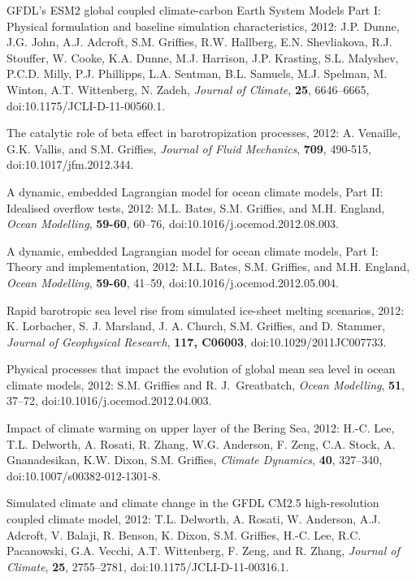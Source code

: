 \begin{etaremune}
\item GFDL’s ESM2 global coupled climate-carbon Earth System Models Part I: Physical formulation and baseline simulation  characteristics, 2012: J.P. Dunne, J.G. John, A.J. Adcroft, S.M. Grif\/f\/ies, R.W. Hallberg, E.N. Shevliakova, R.J. Stouffer,
  W. Cooke, K.A. Dunne, M.J. Harrison, J.P. Krasting, S.L. Malyshev, P.C.D. Milly, P.J. Phillipps, L.A. Sentman, B.L. Samuels,  M.J. Spelman, M. Winton, A.T. Wittenberg, N. Zadeh, {\it Journal of Climate}, {\bf 25}, 6646--6665, doi:10.1175/JCLI-D-11-00560.1.

\item The catalytic role of beta effect in barotropization processes,  2012: A. Venaille, G.K. Vallis, and S.M. Grif\/f\/ies, {\it  Journal of Fluid Mechanics}, {\bf 709}, 490-515, doi:10.1017/jfm.2012.344.

\item A dynamic, embedded Lagrangian model for ocean climate models,  Part II: Idealised overflow tests, 2012: M.L. Bates, S.M. Grif\/f\/ies, and M.H. England, {\it Ocean Modelling}, {\bf
    59-60}, 60--76, doi:10.1016/j.ocemod.2012.08.003.

\item A dynamic, embedded Lagrangian model for ocean climate models, Part I: Theory and implementation, 2012: M.L. Bates, S.M. Grif\/f\/ies, and M.H. England, {\it Ocean Modelling}, {\bf  59-60}, 41--59, doi:10.1016/j.ocemod.2012.05.004.

\item Rapid barotropic sea level rise from simulated ice-sheet melting  scenarios, 2012: K. Lorbacher, S. J. Marsland, J. A. Church, S.M. Grif\/f\/ies, and D. Stammer, {\it Journal of Geophysical Research}, {\bf 117, C06003}, doi:10.1029/2011JC007733.

\item Physical processes that impact the evolution of global mean sea  level in ocean climate models, 2012: S.M. Grif\/f\/ies and R. J.\  Greatbatch, {\it Ocean Modelling}, {\bf 51}, 37--72,  doi:10.1016/j.ocemod.2012.04.003.

\item Impact of climate warming on upper layer of the Bering Sea, 2012: H.-C. Lee, T.L. Delworth, A. Rosati, R. Zhang, W.G. Anderson,  F. Zeng, C.A. Stock, A. Gnanadesikan, K.W. Dixon, S.M. Grif\/f\/ies, {\it Climate Dynamics}, {\bf 40}, 327–340,
\\  doi:10.1007/s00382-012-1301-8.

\item Simulated climate and climate change in the GFDL CM2.5 high-resolution coupled climate model, 2012: T.L. Delworth,  A. Rosati, W. Anderson, A.J. Adcroft, V. Balaji, R. Benson,  K. Dixon, S.M. Grif\/f\/ies, H.-C. Lee, R.C. Pacanowski,  G.A. Vecchi, A.T. Wittenberg, F. Zeng, and R. Zhang, {\it Journal of  Climate}, {\bf 25}, 2755--2781, doi:10.1175/JCLI-D-11-00316.1.


\end{etaremune}
